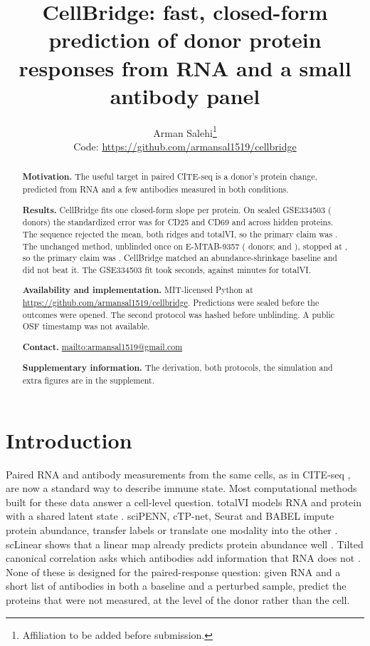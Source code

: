 \documentclass[10pt,a4paper]{article}
\title{\bfseries CellBridge: fast, closed-form prediction of donor protein responses from RNA and a small antibody panel}
\author{Arman Salehi\thanks{Affiliation to be added before submission.}\\
\small Code: \url{https://github.com/armansal1519/cellbridge}}
\date{}
\begin{document}
\maketitle
\vspace{-1.6em}

\begin{abstract}
\noindent\textbf{Motivation.}
The useful target in paired CITE-seq is a donor's protein change, predicted from RNA and a few antibodies measured in both conditions.

\noindent\textbf{Results.}
CellBridge fits one closed-form slope per protein. On sealed GSE334503 (\NGseTest{} donors) the standardized error was \MaeGseCbEone{} for CD25 and CD69 and \MaeGseCbEtwo{} across hidden proteins. The sequence rejected the mean, both ridges and totalVI, so the primary claim was \GseClaim{}. The unchanged method, unblinded once on E-MTAB-9357 (\NEmTest{} donors; \MaeEmCbEone{} and \MaeEmCbEtwo{}), stopped at \EmStopped{}, so the primary claim was \EmClaim{}. CellBridge matched an abundance-shrinkage baseline and did not beat it. The GSE334503 fit took \GseCbSeconds{} seconds, against \GseTvMinutes{} minutes for totalVI.

\noindent\textbf{Availability and implementation.}
MIT-licensed Python at \url{https://github.com/armansal1519/cellbridge}. Predictions were sealed before the outcomes were opened. The second protocol was hashed before unblinding. A public OSF timestamp was not available.

\noindent\textbf{Contact.}
\url{mailto:armansal1519@gmail.com}

\noindent\textbf{Supplementary information.}
The derivation, both protocols, the simulation and extra figures are in the supplement.
\end{abstract}

\section{Introduction}
Paired RNA and antibody measurements from the same cells, as in CITE-seq \citep{stoeckius2017}, are now a standard way to describe immune state. Most computational methods built for these data answer a cell-level question. totalVI models RNA and protein with a shared latent state \citep{gayoso2021}. sciPENN, cTP-net, Seurat and BABEL impute protein abundance, transfer labels or translate one modality into the other \citep{lakkis2022,zhou2020,hao2021,wu2021}. scLinear shows that a linear map already predicts protein abundance well \citep{hanhart2024}. Tilted canonical correlation asks which antibodies add information that RNA does not \citep{lin2023}. None of these is designed for the paired-response question: given RNA and a short list of antibodies in both a baseline and a perturbed sample, predict the proteins that were not measured, at the level of the donor rather than the cell.
\end{document}
